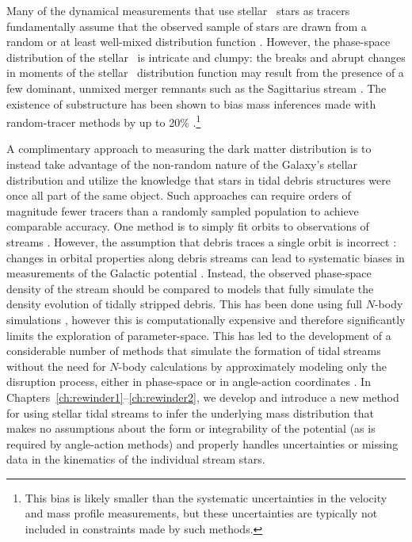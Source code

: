 Many of the dynamical measurements that use stellar \mwhalo\ stars as tracers fundamentally assume that the observed sample of stars are drawn from a random or at least well-mixed distribution function \citep[e.g.,][]{todo jeans}. However, the phase-space distribution of the stellar \mwhalo\ is intricate and clumpy: the breaks and abrupt changes in moments of the stellar \mwhalo\ distribution function may result from the presence of a few dominant, unmixed merger remnants such as the Sagittarius stream \citep[which contains almost as much stellar mass as the rest of the stellar \mwhalo\ combined;][]{todo}. The existence of substructure has been shown to bias mass inferences made with random-tracer methods by up to 20\% \citep{yencho06}.\footnote{This bias is likely smaller than the systematic uncertainties in the velocity and mass profile measurements, but these uncertainties are typically not included in constraints made by such methods.} 

A complimentary approach to measuring the dark matter distribution is to instead take advantage of the non-random nature of the Galaxy's stellar distribution and utilize the knowledge that stars in tidal debris structures were once all part of the same object. Such approaches can require orders of magnitude fewer tracers than a randomly sampled population to achieve comparable accuracy. One method is to simply fit orbits to observations of streams \citep[e.g.,][]{koposov10}. However, the assumption that debris traces a single orbit is incorrect \citep[see][]{johnston98,helmi99}: changes in orbital properties along debris streams can lead to systematic biases in measurements of the Galactic potential \citep{eyre09a,varghese11}. Instead, the observed phase-space density of the stream should be compared to models that fully simulate the density evolution of tidally stripped debris. This has been done using full $N$-body simulations \citep{todo, law10}, however this is computationally expensive and therefore significantly limits the exploration of parameter-space. This has led to the development of a considerable number of methods that simulate the formation of tidal streams without the need for $N$-body calculations by approximately modeling only the disruption process, either in phase-space \citep{varghese11, kuepper12, todo} or in angle-action coordinates \citep{sanders,todo}. In Chapters~\ref{ch:rewinder1}--\ref{ch:rewinder2}, we develop and introduce a new method for using stellar tidal streams to infer the underlying mass distribution that makes no assumptions about the form or integrability of the potential (as is required by angle-action methods) and properly handles uncertainties or missing data in the kinematics of the individual stream stars.

